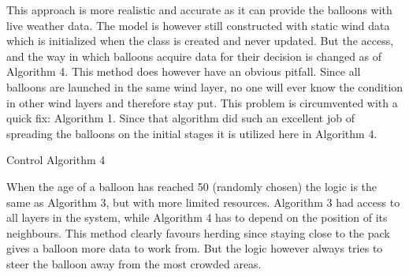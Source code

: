 This approach is more realistic and accurate as it can provide the balloons with live weather data. The model is however still constructed with static wind data which is initialized when the class is created and never updated. But the access, and the way in which balloons acquire data for their decision is changed as of Algorithm 4. This method does however have an obvious pitfall. Since all balloons are launched in the same wind layer, no one will ever know the condition in other wind layers and therefore stay put. This problem is circumvented with a quick fix: Algorithm 1. Since that algorithm did such an excellent job of spreading the balloons on the initial stages it is utilized here in Algorithm 4.

\begin{algorithm}[H]
\caption{Control Algorithm 4}
\label{alg:4}
\end{algorithm}

When the age of a balloon has reached 50 (randomly chosen) the logic is the same as Algorithm 3, but with more limited resources. Algorithm 3 had access to all layers in the system, while Algorithm 4 has to depend on the position of its neighbours. This method clearly favours herding since staying close to the pack gives a balloon more data to work from. But the logic however always tries to steer the balloon away from the most crowded areas. 

